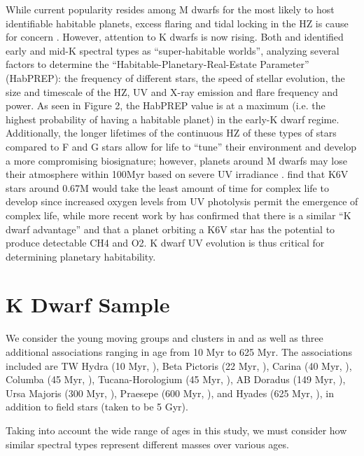 \documentclass[preprint2]{aastex62}
\begin{document}
While current popularity resides among M dwarfs for the most likely to host identifiable habitable planets, excess flaring and tidal locking in the HZ is cause for concern \citep[e.g.][]{Shields2016}. However, attention to K dwarfs is now rising. Both \citet{Heller2014} and \citet{Cuntz2016} identified early and mid-K spectral types as “super-habitable worlds”, analyzing several factors to determine the “Habitable-Planetary-Real-Estate Parameter” (HabPREP): the frequency of different stars, the speed of stellar evolution, the size and timescale of the HZ, UV and X-ray emission and flare frequency and power. As seen in Figure 2, the HabPREP value is at a maximum (i.e. the highest probability of having a habitable planet) in the early-K dwarf regime. Additionally, the longer lifetimes of the continuous HZ of these types of stars compared to F and G stars allow for life to “tune” their environment and develop a more compromising biosignature; however, planets around M dwarfs may lose their atmosphere within 100Myr based on severe UV irradiance \citep{Airapetian2017}. \citet{Lingam2017} find that K6V stars around 0.67M  would take the least amount of time for complex life to develop since increased oxygen levels from UV photolysis permit the emergence of complex life, while more recent work by \citet{Arney2017}
has confirmed that there is a similar “K dwarf advantage” and that a planet orbiting a K6V star has the potential to produce detectable CH4 and O2. K dwarf UV evolution is thus critical for determining planetary habitability.

\section{K Dwarf Sample}\label{sec:sample}

We consider the young moving groups and clusters in \citet{Shkolnik2014} and \citet{Schneider2018} as well as three additional associations ranging in age from 10 Myr to 625 Myr. The associations included are TW Hydra (10 Myr, \citealt{Bell2015}), Beta Pictoris (22 Myr, \citealt{Shkolnik2017}), Carina (40 Myr, \citealt{Torres2008}), Columba (45 Myr, \citealt{Zuckerman2011}), Tucana-Horologium (45 Myr, \citealt{Bell2015}), AB Doradus (149 Myr, \citealt{Bell2015}), Ursa Majoris (300 Myr, \citealt{King2005}), Praesepe (600 Myr, \citealt{Kraus2007}), and Hyades (625 Myr, \citealt{Perryman1997}), in addition to field stars (taken to be 5 Gyr).

Taking into account the wide range of ages in this study, we must consider how similar spectral types represent different masses over various ages. 
\end{document}
